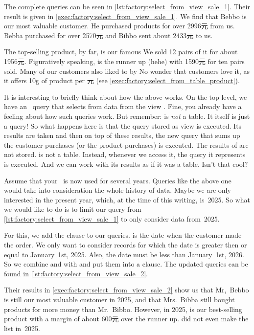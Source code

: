The complete queries can be seen in \cref{lst:factory:select_from_view_sale_1}.
Their result is given in \cref{exec:factory:select_from_view_sale_1}.
We find that Bebbo is our most valuable customer.
He purchased products for over 2996元 from us.
Bebba purchased for over 2570元 and Bibbo sent about 2433元 to us.

The top-selling product, by far, is our famous 
We sold 12 pairs of it for about 1956元.
Figuratively speaking,  is the runner up (hehe) with 1590元 for ten pairs sold.
Many of our customers also liked to by 
No wonder that customers love it, as it offers 10g of product per 元 (see \cref{exec:factory:select_from_table_product}).

It is interesting to briefly think about how the above works.
On the top level, we have an \sql\ query that selects from data from the view .
Fine, you already have a feeling about how such queries work.
But remember:  is \emph{not} a table.
It itself is just a query!
So what happens here is that the query stored as view  is executed.
Its results are taken and then on top of these results, the new query that sums up the customer purchases (or the product purchases) is executed.
The results of  are not stored.
 is not a table.
Instead, whenever we access it, the query it represents is executed.
And we can work with its results as if it was a table.
Isn't that cool?

Assume that your \db\ is now used for several years.
Queries like the above one would take into consideration the whole history of data.
Maybe we are only interested in the present year, which, at the time of this writing, is~2025.
So what we would like to do is to limit our query from \cref{lst:factory:select_from_view_sale_1} to only consider data from~2025.%
%
\begin{sloppypar}%
For this, we add the clause  to our queries.
 is the date when the customer made the order.
We only want to consider records for which the date is greater then or equal to January~1st, 2025.
Also, the date must be less than January~1st, 2026.
So we combine  and  with  and put them into a  clause.
The updated queries can be found in \cref{lst:factory:select_from_view_sale_2}.%
\end{sloppypar}%
%
Their results in \cref{exec:factory:select_from_view_sale_2} show us that Mr,~Bebbo is still our most valuable customer in 2025, and that Mrs.~Bibba still bought products for more money than Mr.~Bibbo.
However, in 2025,  is our best-selling product with a margin of about 600元 over the runner up.
 did not even make the list in~2025.


